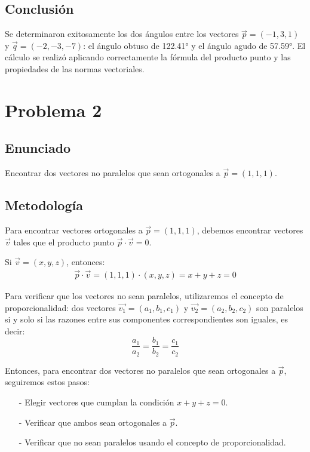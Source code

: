\documentclass{article}
\begin{document}
\subsection{Conclusión}
Se determinaron exitosamente los dos ángulos entre los vectores $\vec{p} = (-1, 3, 1)$ y $\vec{q} = (-2, -3, -7)$: el ángulo obtuso de 122.41° y el ángulo agudo de 57.59°. El cálculo se realizó aplicando correctamente la fórmula del producto punto y las propiedades de las normas vectoriales.

\section{Problema 2}

\subsection{Enunciado}
Encontrar dos vectores no paralelos que sean ortogonales a $\vec{p} = (1, 1, 1)$.

\subsection{Metodología}

Para encontrar vectores ortogonales a $\vec{p} = (1, 1, 1)$, debemos encontrar vectores $\vec{v}$ tales que el producto punto $\vec{p} \cdot \vec{v} = 0$.

Si $\vec{v} = (x, y, z)$, entonces:
\begin{align}
\vec{p} \cdot \vec{v} = (1, 1, 1) \cdot (x, y, z) = x + y + z = 0
\end{align}

Para verificar que los vectores no sean paralelos, utilizaremos el concepto de proporcionalidad: dos vectores $\vec{v_1} = (a_1, b_1, c_1)$ y $\vec{v_2} = (a_2, b_2, c_2)$ son paralelos si y solo si las razones entre sus componentes correspondientes son iguales, es decir:
$$\frac{a_1}{a_2} = \frac{b_1}{b_2} = \frac{c_1}{c_2}$$

Entonces, para encontrar dos vectores no paralelos que sean ortogonales a $\vec{p}$, seguiremos estos pasos:
\begin{enumerate}
    \item[-] Elegir vectores que cumplan la condición $x + y + z = 0$.
    \item[-] Verificar que ambos sean ortogonales a $\vec{p}$.
    \item[-] Verificar que no sean paralelos usando el concepto de proporcionalidad.
\end{enumerate}
\end{document}
